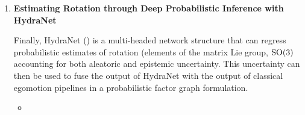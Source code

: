 \begin{enumerate}
\item \textbf{Estimating Rotation through Deep Probabilistic Inference with HydraNet}

Finally, HydraNet () is a multi-headed network structure that can regress probabilistic estimates of rotation (elements of the matrix Lie group, $\mathrm{SO}(3)$ accounting for both aleatoric and epistemic uncertainty. This uncertainty can then be used to fuse the output of HydraNet with the output of classical egomotion pipelines in a probabilistic factor graph formulation.

\begin{itemize}
\item {}
\end{itemize}


\end{enumerate}

%






